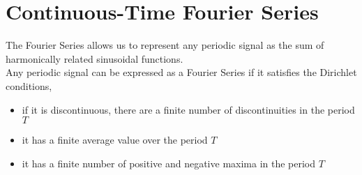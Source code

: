 		\section{Continuous-Time Fourier Series}
		The Fourier Series allows us to represent any periodic signal as the sum of harmonically related sinusoidal functions.\\
		Any periodic signal can be expressed as a Fourier Series if it satisfies the Dirichlet conditions,
		\begin{itemize}
			\item if it is discontinuous, there are a finite number of discontinuities in the period $T$
			\item it has a finite average value over the period $T$
			\item it has a finite number of positive and negative maxima in the period $T$
		\end{itemize} 
